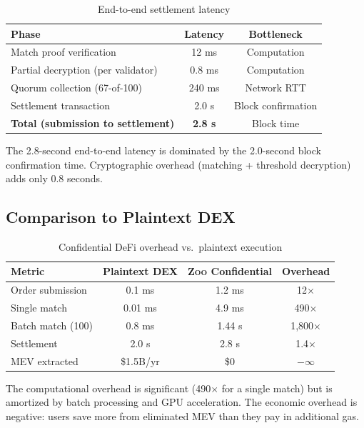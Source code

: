 \documentclass[11pt,letterpaper]{article}
\theoremstyle{definition}
\theoremstyle{remark}
\newcommand{\Zoo}{\textsc{Zoo}}
\newcommand{\MEV}{\textsc{MEV}}
\newcommand{\DEX}{\textsc{DEX}}
\begin{document}
\begin{table}[h]
\centering
\begin{tabular}{lcc}
\toprule
\textbf{Phase} & \textbf{Latency} & \textbf{Bottleneck} \\
\midrule
Match proof verification & 12 ms & Computation \\
Partial decryption (per validator) & 0.8 ms & Computation \\
Quorum collection (67-of-100) & 240 ms & Network RTT \\
Settlement transaction & 2.0 s & Block confirmation \\
\midrule
\textbf{Total (submission to settlement)} & \textbf{2.8 s} & Block time \\
\bottomrule
\end{tabular}
\caption{End-to-end settlement latency}
\label{tab:settlement_bench}
\end{table}

The 2.8-second end-to-end latency is dominated by the 2.0-second block confirmation time. Cryptographic overhead (matching + threshold decryption) adds only 0.8 seconds.

\subsection{Comparison to Plaintext DEX}

\begin{table}[h]
\centering
\begin{tabular}{lccc}
\toprule
\textbf{Metric} & \textbf{Plaintext \DEX{}} & \textbf{\Zoo{} Confidential} & \textbf{Overhead} \\
\midrule
Order submission & 0.1 ms & 1.2 ms & 12$\times$ \\
Single match & 0.01 ms & 4.9 ms & 490$\times$ \\
Batch match (100) & 0.8 ms & 1.44 s & 1,800$\times$ \\
Settlement & 2.0 s & 2.8 s & 1.4$\times$ \\
MEV extracted & \$1.5B/yr & \$0 & $-\infty$ \\
\bottomrule
\end{tabular}
\caption{Confidential DeFi overhead vs.\ plaintext execution}
\label{tab:overhead}
\end{table}

The computational overhead is significant (490$\times$ for a single match) but is amortized by batch processing and GPU acceleration. The economic overhead is negative: users save more from eliminated \MEV{} than they pay in additional gas.
\end{document}
